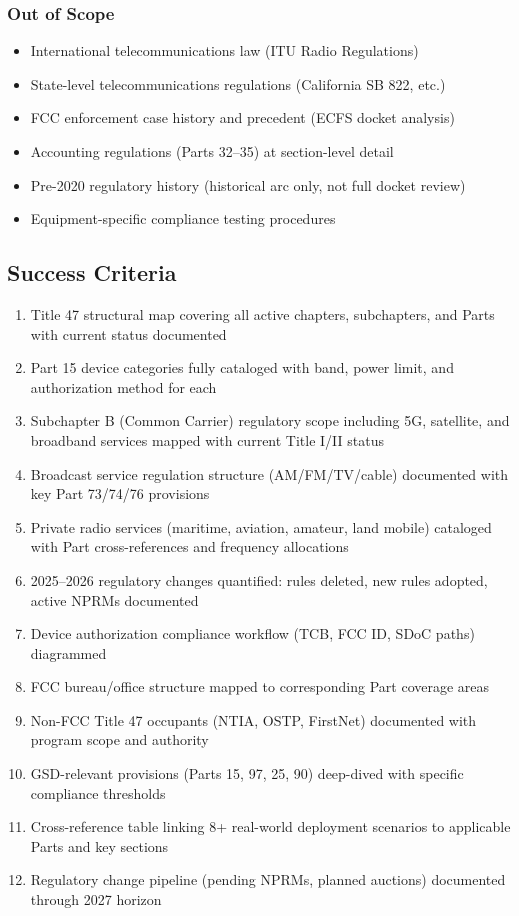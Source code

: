 \documentclass[11pt,letterpaper]{article}
\begin{document}
\subsubsection{Out of Scope}
\begin{itemize}[leftmargin=1.5em]
  \item International telecommunications law (ITU Radio Regulations)
  \item State-level telecommunications regulations (California SB 822, etc.)
  \item FCC enforcement case history and precedent (ECFS docket analysis)
  \item Accounting regulations (Parts 32--35) at section-level detail
  \item Pre-2020 regulatory history (historical arc only, not full docket review)
  \item Equipment-specific compliance testing procedures
\end{itemize}

\subsection{Success Criteria}

\begin{enumerate}
  \item Title 47 structural map covering all active chapters, subchapters, and Parts with current status documented
  \item Part 15 device categories fully cataloged with band, power limit, and authorization method for each
  \item Subchapter B (Common Carrier) regulatory scope including 5G, satellite, and broadband services mapped with current Title I/II status
  \item Broadcast service regulation structure (AM/FM/TV/cable) documented with key Part 73/74/76 provisions
  \item Private radio services (maritime, aviation, amateur, land mobile) cataloged with Part cross-references and frequency allocations
  \item 2025--2026 regulatory changes quantified: rules deleted, new rules adopted, active NPRMs documented
  \item Device authorization compliance workflow (TCB, FCC ID, SDoC paths) diagrammed
  \item FCC bureau/office structure mapped to corresponding Part coverage areas
  \item Non-FCC Title 47 occupants (NTIA, OSTP, FirstNet) documented with program scope and authority
  \item GSD-relevant provisions (Parts 15, 97, 25, 90) deep-dived with specific compliance thresholds
  \item Cross-reference table linking 8+ real-world deployment scenarios to applicable Parts and key sections
  \item Regulatory change pipeline (pending NPRMs, planned auctions) documented through 2027 horizon
\end{enumerate}
\end{document}
